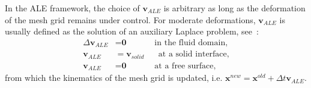 In the ALE framework, the choice of ${\textbf{v}}_{ALE}$ is arbitrary as long as the deformation of the mesh grid remains under control. For moderate deformations, ${\textbf{v}}_{ALE}$ is usually defined as the solution of an auxiliary Laplace problem, see~\cite{duarte2004arbitrary}:
\begin{subequations}
\begin{align}
\Delta {\textbf{v}}_{ALE} &= {\textbf{0}} \;\;\;\;\;\;\;\;\;\;\;\; \text{in the fluid domain,}\\
{\textbf{v}}_{ALE} &= {\textbf{v}}_{solid} \;\;\;\;\;\; \text{at a solid interface,}\\
{\textbf{v}}_{ALE} &= {\textbf{0}} \;\;\;\;\;\;\;\;\;\;\;\;\text{at a free surface,} 
\end{align}
\end{subequations}
from which the kinematics of the mesh grid is updated, i.e. ${\textbf{x}}^{new}={\textbf{x}}^{old} + \Delta t{\textbf{v}}_{ALE}$.

%



